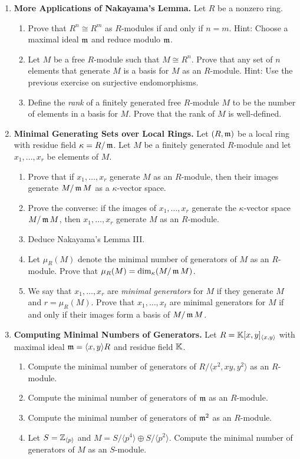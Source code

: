 \documentclass[Notebook.tex]{subfiles}
\begin{document}
\begin{enumerate}[leftmargin=*, resume=problems]
\item \textbf{More Applications of Nakayama's Lemma.} Let $R$ be a nonzero ring.
\begin{enumerate}
	\item Prove that $R^{n}\cong R^{m}$ as $R$-modules if and only if $n=m$. Hint: Choose a maximal ideal $\operatorname{\mathfrak{m}}$ and reduce modulo $\operatorname{\mathfrak{m}}$.
	\item Let $M$ be a free $R$-module such that $M \cong R^{n}$. Prove that any set of $n$ elements that generate $M$ is a basis for $M$ as an $R$-module. Hint: Use the previous exercise on surjective endomorphisms.
	\item Define the \emph{rank} of a finitely generated free $R$-module $M$ to be the number of elements in a basis for $M$. Prove that the rank of $M$ is well-defined.
\end{enumerate}

\item \textbf{Minimal Generating Sets over Local Rings.} Let $(R,\operatorname{\mathfrak{m}})$ be a local ring with residue field $\kappa=R/\operatorname{\mathfrak{m}}$. Let $M$ be a finitely generated $R$-module and let $x_1,\ldots,x_r$ be elements of $M$.
\begin{enumerate}
    \item Prove that if $x_1,\ldots,x_r$ generate $M$ as an $R$-module, then their images generate $M/\operatorname{\mathfrak{m}} M$ as a $\kappa$-vector space.
    \item Prove the converse: if the images of $x_1,\ldots,x_r$ generate the $\kappa$-vector space $M/\operatorname{\mathfrak{m}} M$, then $x_1,\ldots,x_r$ generate $M$ as an $R$-module.
    \item Deduce Nakayama's Lemma III.
    \item Let $\mu_R(M)$ denote the minimal number of generators of $M$ as an $R$-module. Prove that $\mu_R(M)=\dim_{\kappa}(M/\operatorname{\mathfrak{m}} M)$. 
    \item We say that $x_{1},\ldots,x_{r}$ are \emph{minimal generators} for $M$ if they generate $M$ and $r=\mu_{R}(M)$. Prove that $x_1,\ldots,x_t$ are minimal generators for $M$ if and only if their images form a basis of $M/\operatorname{\mathfrak{m}} M$.
\end{enumerate}

\item \textbf{Computing Minimal Numbers of Generators.} Let $R=\mathbb K[x,y]_{\langle x,y\rangle}$ with maximal ideal $\operatorname{\mathfrak{m}}=\langle x,y\rangle R$ and residue field $\mathbb K$.
\begin{enumerate}
    \item Compute the minimal number of generators of $R/\langle x^2,xy,y^2\rangle$ as an $R$-module.
    \item Compute the minimal number of generators of $\operatorname{\mathfrak{m}}$ as an $R$-module.
    \item Compute the minimal number of generators of $\operatorname{\mathfrak{m}}^2$ as an $R$-module.
    \item Let $S=\mathbb Z_{\langle p\rangle}$ and $M=S/\langle p^4\rangle\oplus S/\langle p^2\rangle$. Compute the minimal number of generators of $M$ as an $S$-module.
\end{enumerate}


\end{enumerate}
\end{document}
